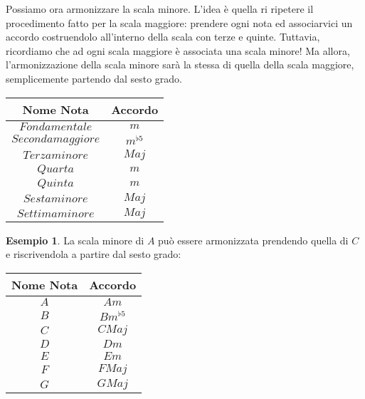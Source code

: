 \documentclass[12pt,a4paper]{report}
\theoremstyle{definition}
\theoremstyle{Theorem}
\theoremstyle{definition}
\newtheorem{Ex}[Def]{Esempio}
\theoremstyle{definition}
\theoremstyle{definition}
\begin{document}
	 		Possiamo ora armonizzare la scala minore. L'idea è quella ri ripetere il procedimento fatto per la scala maggiore: prendere ogni nota ed associarvici un accordo costruendolo all'interno della scala con terze e quinte. Tuttavia, ricordiamo che ad ogni scala maggiore è associata una scala minore! Ma allora, l'armonizzazione della scala minore sarà la stessa di quella della scala maggiore, semplicemente partendo dal sesto grado.
	 		\begin{center}
	 			\begin{tabular}{||c|c||}
	 				\hline
	 				Nome Nota & Accordo\\
	 				\hline
	 				$Fondamentale$ & $m$\\
	 				\hline
	 				$Seconda maggiore$ & $m^{\flat5}$\\
	 				\hline
	 				$Terza minore$ & $Maj$\\
	 				\hline
	 				$Quarta$ & $m$\\
	 				\hline
	 				$Quinta$ & $m$\\
	 				\hline
	 				$Sesta minore$ & $Maj$\\
	 				\hline
	 				$Settima minore$ & $Maj$\\
	 				\hline
	 			\end{tabular}
	 		\end{center}
	 		\begin{Ex}
	 			La scala minore di $A$ può essere armonizzata prendendo quella di $C$ e riscrivendola a partire dal sesto grado:
	 			\begin{center}
	 				\begin{tabular}{||c|c||}
	 					\hline
	 					Nome Nota & Accordo\\
	 					\hline
	 					$A$ & $Am$\\
	 					\hline
	 					$B$ & $Bm^{\flat5}$\\
	 					\hline
	 					$C$ & $CMaj$\\
	 					\hline
	 					$D$ & $Dm$\\
	 					\hline
	 					$E$ & $Em$\\
	 					\hline
	 					$F$ & $FMaj$\\
	 					\hline
	 					$G$ & $GMaj$\\
	 					\hline
	 				\end{tabular}
	 			\end{center}
	 		\end{Ex}
\end{document}
